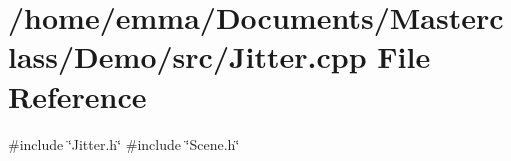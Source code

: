 \section{/home/emma/\+Documents/\+Masterclass/\+Demo/src/\+Jitter.cpp File Reference}
\label{_jitter_8cpp}
{\ttfamily \#include \char`\"{}Jitter.\+h\char`\"{}}\newline
{\ttfamily \#include \char`\"{}Scene.\+h\char`\"{}}\newline
